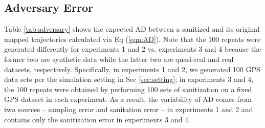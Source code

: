 \documentclass[10pt,journal,compsoc]{IEEEtran}
\begin{document}
\vspace{-12pt}\subsection{Adversary Error}\vspace{-3pt}
Table \ref{tab:adversary} shows the expected AD between a sanitized and its original mapped trajectories calculated via Eq (\ref{eqn:AD}). Note that the 100 repeats were generated differently for experiments 1 and 2 vs. experiments 3 and 4 because the former two are synthetic data while the latter two  are quasi-real and real datasets, respectively. Specifically,  in experiments 1 and 2, we generated 100 GPS data sets per the simulation setting in Sec \ref{sec:setting}; in experiments 3 and 4, the 100 repeats were obtained by performing 100 sets of sanitization on a fixed GPS dataset in each experiment. As a result, the variability of AD  comes from two sources -- sampling error and sanitation error -- in experiments 1 and 2 and contains only the sanitization error in experiments 3 and 4.
\end{document}
